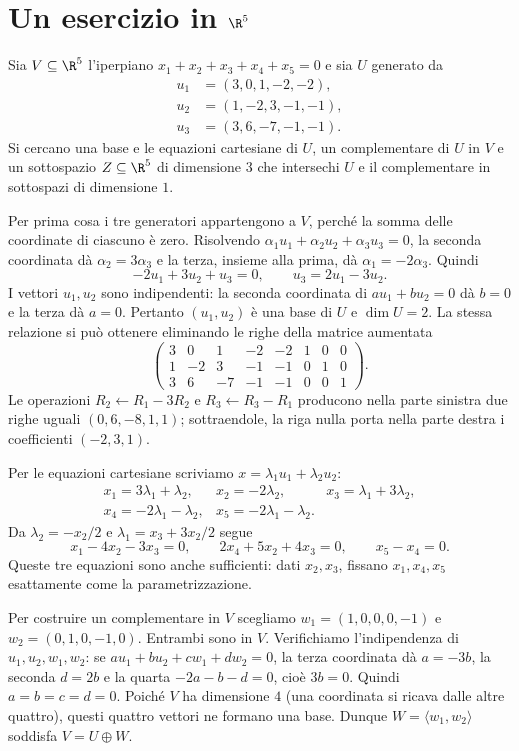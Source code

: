 \section{Un esercizio in \texorpdfstring{$\R^5$}{R5}}
\begin{esercizio}
Sia $V\subseteq\R^5$ l'iperpiano
$x_1+x_2+x_3+x_4+x_5=0$ e sia $U$ generato da
\begin{align*}
u_1&=(3,0,1,-2,-2),\\
u_2&=(1,-2,3,-1,-1),\\
u_3&=(3,6,-7,-1,-1).
\end{align*}
Si cercano una base e le equazioni cartesiane di $U$, un
complementare di $U$ in $V$ e un sottospazio $Z\subseteq\R^5$
di dimensione $3$ che intersechi $U$ e il complementare in
sottospazi di dimensione $1$.

Per prima cosa i tre generatori appartengono a $V$, perché la
somma delle coordinate di ciascuno è zero. Risolvendo
$\alpha_1u_1+\alpha_2u_2+\alpha_3u_3=0$, la seconda
coordinata dà $\alpha_2=3\alpha_3$ e la terza, insieme alla
prima, dà $\alpha_1=-2\alpha_3$. Quindi
\[
-2u_1+3u_2+u_3=0,
\qquad u_3=2u_1-3u_2.
\]
I vettori $u_1,u_2$ sono indipendenti: la seconda coordinata
di $a u_1+b u_2=0$ dà $b=0$ e la terza dà $a=0$.
Pertanto $(u_1,u_2)$ è una base di $U$ e $\dim U=2$.
La stessa relazione si può ottenere eliminando le righe della
matrice aumentata
\[
\left(\begin{array}{rrrrr|rrr}
3&0&1&-2&-2&1&0&0\\
1&-2&3&-1&-1&0&1&0\\
3&6&-7&-1&-1&0&0&1
\end{array}\right).
\]
Le operazioni $R_2\leftarrow R_1-3R_2$ e
$R_3\leftarrow R_3-R_1$ producono nella parte sinistra due
righe uguali $(0,6,-8,1,1)$; sottraendole, la riga nulla
porta nella parte destra i coefficienti $(-2,3,1)$.

Per le equazioni cartesiane scriviamo
$x=\lambda_1u_1+\lambda_2u_2$:
\[
\begin{array}{lll}
x_1=3\lambda_1+\lambda_2,&x_2=-2\lambda_2,&
x_3=\lambda_1+3\lambda_2,\\
x_4=-2\lambda_1-\lambda_2,&
x_5=-2\lambda_1-\lambda_2.&
\end{array}
\]
Da $\lambda_2=-x_2/2$ e
$\lambda_1=x_3+3x_2/2$ segue
\[
\boxed{\quad x_1-4x_2-3x_3=0,\qquad
2x_4+5x_2+4x_3=0,\qquad x_5-x_4=0.\quad}
\]
Queste tre equazioni sono anche sufficienti: dati $x_2,x_3$,
fissano $x_1,x_4,x_5$ esattamente come la parametrizzazione.

Per costruire un complementare in $V$ scegliamo
$w_1=(1,0,0,0,-1)$ e $w_2=(0,1,0,-1,0)$.
Entrambi sono in $V$. Verifichiamo l'indipendenza di
$u_1,u_2,w_1,w_2$: se
$a u_1+b u_2+c w_1+d w_2=0$, la terza coordinata dà
$a=-3b$, la seconda $d=2b$ e la quarta
$-2a-b-d=0$, cioè $3b=0$. Quindi $a=b=c=d=0$.
Poiché $V$ ha dimensione $4$ (una coordinata si ricava dalle
altre quattro), questi quattro vettori ne formano una base.
Dunque $W=\langle w_1,w_2\rangle$ soddisfa
$V=U\oplus W$.


\end{esercizio}
